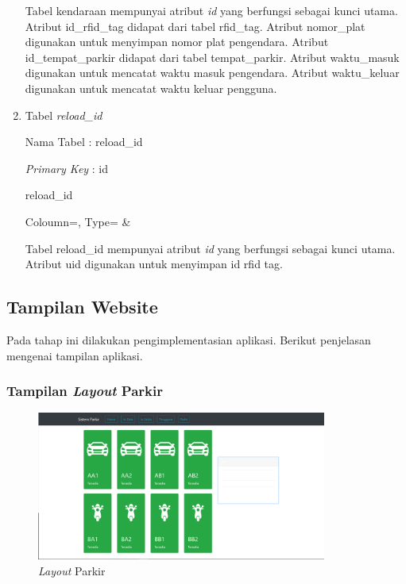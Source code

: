 \begin{enumerate}[topsep=0pt,itemsep=0pt,partopsep=0pt, parsep=0pt]
    Tabel kendaraan mempunyai atribut \textit{id} yang berfungsi sebagai kunci utama. Atribut id\_rfid\_tag didapat dari tabel rfid\_tag. Atribut nomor\_plat digunakan untuk menyimpan nomor plat pengendara. Atribut id\_tempat\_parkir didapat dari tabel tempat\_parkir. Atribut waktu\_masuk digunakan untuk mencatat waktu masuk pengendara. Atribut waktu\_keluar digunakan untuk mencatat waktu keluar pengguna.

    \item Tabel \textit{reload\_id}

    Nama Tabel : reload\_id

    \textit{Primary Key} : id

    \begin{table} [H]
        \centering
        \caption{reload\_id}
        \label{table:db_reload_id}
            {
                Coloumn=\Coloumn, 
                Type=\Type}
            {
                \Coloumn & 
                \Type}
    \end{table}

    Tabel reload\_id mempunyai atribut \textit{id} yang berfungsi sebagai kunci utama. Atribut uid digunakan untuk menyimpan id rfid tag.

\end{enumerate}

\subsection{Tampilan Website}
Pada tahap ini dilakukan pengimplementasian aplikasi. Berikut penjelasan mengenai tampilan aplikasi.

\subsubsection{Tampilan \textit{Layout} Parkir}
\begin{figure} [H]
    \includegraphics[width=0.85\textwidth, center]{images/web 1 layout parkir.png}
    \caption{\textit{Layout} Parkir}
    \label{fig:web1layout-parkir}
\end{figure}

